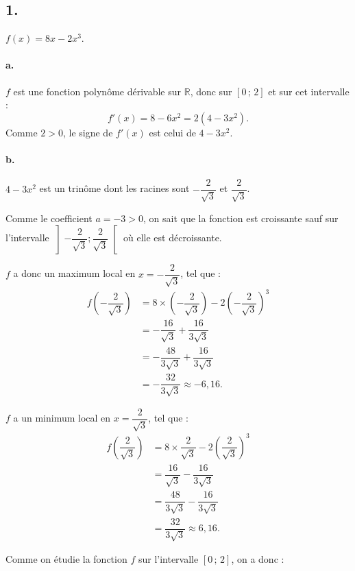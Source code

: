 \subsection*{1.}

\(f(x) = 8x - 2x^3\).

\paragraph{a.} \( f \) est une fonction polynôme dérivable sur \( \mathbb{R} \), donc sur \([0\,;\,2]\) et sur cet intervalle :
\[
f'(x) = 8 - 6x^2 = 2(4 - 3x^2).
\]
Comme \( 2 > 0 \), le signe de \( f'(x) \) est celui de \( 4 - 3x^2 \).

\paragraph{b.} \( 4 - 3x^2 \) est un trinôme dont les racines sont \( -\dfrac{2}{\sqrt{3}} \) et \( \dfrac{2}{\sqrt{3}} \).

Comme le coefficient \( a = -3 > 0 \), on sait que la fonction est croissante sauf sur l'intervalle \( \left] -\dfrac{2}{\sqrt{3}} ; \dfrac{2}{\sqrt{3}} \right[ \) où elle est décroissante.

\( f \) a donc un maximum local en \( x = -\dfrac{2}{\sqrt{3}} \), tel que :
\begin{align*}
f\left( -\dfrac{2}{\sqrt{3}} \right) &= 8 \times \left( -\dfrac{2}{\sqrt{3}} \right) - 2\left( -\dfrac{2}{\sqrt{3}} \right)^3 \\
&= -\dfrac{16}{\sqrt{3}} + \dfrac{16}{3\sqrt{3}} \\
&= -\dfrac{48}{3\sqrt{3}} + \dfrac{16}{3\sqrt{3}} \\
&= -\dfrac{32}{3\sqrt{3}} \approx -6{,}16.
\end{align*}

\( f \) a un minimum local en \( x = \dfrac{2}{\sqrt{3}} \), tel que :
\begin{align*}
f\left( \dfrac{2}{\sqrt{3}} \right) &= 8 \times \dfrac{2}{\sqrt{3}} - 2\left( \dfrac{2}{\sqrt{3}} \right)^3 \\
&= \dfrac{16}{\sqrt{3}} - \dfrac{16}{3\sqrt{3}} \\
&= \dfrac{48}{3\sqrt{3}} - \dfrac{16}{3\sqrt{3}} \\
&= \dfrac{32}{3\sqrt{3}} \approx 6{,}16.
\end{align*}

Comme on étudie la fonction \( f \) sur l'intervalle \([0\,;\,2]\), on a donc :

